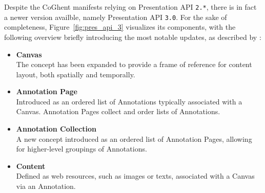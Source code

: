 Despite the CoGhent manifests relying on Presentation API \texttt{2.*}, there is in fact a newer version availble, namely Presentation API \texttt{3.0}. For the sake of completeness, Figure~\ref{fig:pres_api_3} visualizes its components, with the following overview briefly introducing the most notable updates, as described by \citet{appleby2020presentation}:
\begin{itemize}
    \item \textbf{Canvas}\\
    The concept has been expanded to provide a frame of reference for content layout, both spatially and temporally.
    \item \textbf{Annotation Page}\\
    Introduced as an ordered list of Annotations typically associated with a Canvas. Annotation Pages collect and order lists of Annotations.
    \item \textbf{Annotation Collection}\\
    A new concept introduced as an ordered list of Annotation Pages, allowing for higher-level groupings of Annotations.
    \item \textbf{Content}\\
    Defined as web resources, such as images or texts, associated with a Canvas via an Annotation.
\end{itemize}

